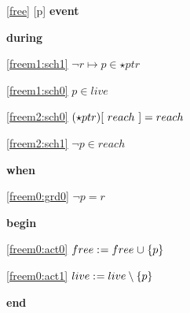 \noindent \ref{free} [p] \textbf{event}
\begin{block}
  \item   \textbf{during}
  \begin{block}
  \item[ \eqref{freem1:sch1} ]\sout{$\neg r \mapsto p \in \star ptr$} %
  \end{block}
  \begin{block}
  \item[ \eqref{freem1:sch0} ]{$p \in live$} %
  \item[ \eqref{freem2:sch0} ]{$(\star ptr)[~reach~] = reach $} %
  \item[ \eqref{freem2:sch1} ]{$\neg p \in reach $} %
  \end{block}
  \item   \textbf{when}
  \begin{block}
  \item[ \eqref{freem0:grd0} ]{$\neg p = r $} %
  \end{block}
  \item   \textbf{begin}
  \begin{block}
  \item[ \eqref{freem0:act0} ]{$free \mathrel{:\mkern1mu=} free \mathbin{\mkern1mu\cup\mkern1mu} \{ p \} $} %
  \item[ \eqref{freem0:act1} ]{$live \mathrel{:\mkern1mu=} live \setminus \{ p \} $} %
  \end{block}
  \item   \textbf{end} \\
\end{block}
